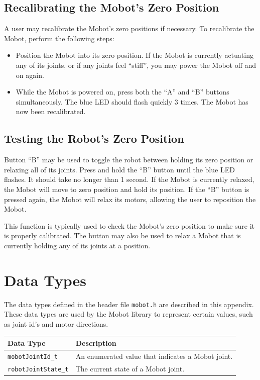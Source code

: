 \documentclass{article}
\begin{document}
\subsection{Recalibrating the Mobot's Zero Position}
A user may recalibrate the Mobot's zero positions if necessary. To recalibrate
the Mobot, perform the following steps:
\begin{itemize}
\item Position the Mobot into its zero position. If the Mobot is currently
actuating any of its joints, or if any joints feel ``stiff'', you may power the
Mobot off and on again.
\item While the Mobot is powered on, press both the ``A'' and ``B'' buttons
simultaneously. The blue LED should flash quickly 3 times. The Mobot has now
been recalibrated.
\end{itemize}

\subsection{\label{sec:zeroposition}Testing the Robot's Zero Position}
Button ``B'' may be used to toggle the robot between holding its zero position 
or relaxing all of its joints. Press and hold the ``B'' button until the blue
LED flashes. It should take no longer than 1 second. If the Mobot is currently relaxed,
the Mobot will move to zero position and hold its position. If the ``B'' button is pressed again, the 
Mobot will relax its motors, allowing the user to reposition the Mobot.

This function is typically used to check the Mobot's zero position to make sure
it is properly calibrated. The button may also be used to relax a Mobot that
is currently holding any of its joints at a position.

\newpage
\appendix
\section{\label{sec:datatypes}Data Types}
The data types defined in the header file \texttt{mobot.h} are described in
this appendix.
These data types are used by the Mobot library to represent 
certain values, such as joint id's and motor directions.

\begin{tabular}{p{3.5cm}p{10cm}} \hline 
Data Type& Description \\
\hline 
\texttt{mobotJointId\_t} & An enumerated value that indicates a Mobot joint. \\
\texttt{robotJointState\_t} & The current state of a Mobot joint. \\
\hline
\end{tabular}
\end{document}
